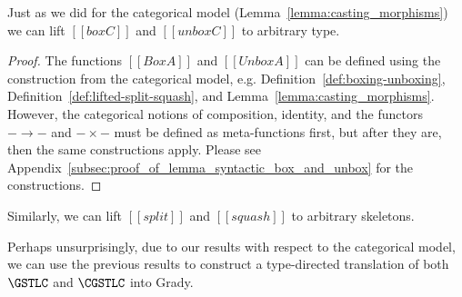 Just as we did for the categorical model
(Lemma~\ref{lemma:casting_morphisms}) we can lift $[[box C]]$ and
$[[unbox C]]$ to arbitrary type.
\begin{proof}
  The functions $[[Box A]]$ and $[[Unbox A]]$ can be defined using the
  construction from the categorical model,
  e.g. Definition~\ref{def:boxing-unboxing},
  Definition~\ref{def:lifted-split-squash}, and
  Lemma~\ref{lemma:casting_morphisms}.  However, the categorical
  notions of composition, identity, and the functors $- \to -$ and $-
  \times -$ must be defined as meta-functions first, but after they
  are, then the same constructions apply.  Please see
  Appendix~\ref{subsec:proof_of_lemma_syntactic_box_and_unbox} for the
  constructions.
\end{proof}
\noindent
Similarly, we can lift $[[split]]$ and $[[squash]]$ to arbitrary
skeletons.
\noindent
Perhaps unsurprisingly, due to our results with respect to the
categorical model, we can use the previous results to construct a
type-directed translation of both $\GSTLC$ and $\CGSTLC$ into Grady.

